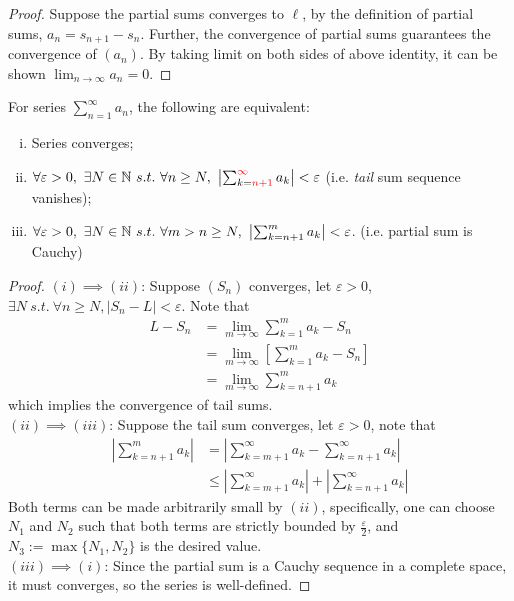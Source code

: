 \documentclass[11pt]{article}
\begin{document}
	\begin{proof}
		Suppose the partial sums converges to $\ell$, by the definition of partial sums, $a_n = s_{n+1} - s_{n}$. Further, the convergence of partial sums guarantees the convergence of $(a_n)$. By taking limit on both sides of above identity, it can be shown $\lim_{n \to \infty} a_n = 0$.
	\end{proof}
	
	\begin{theorem}
		For series $\sum_{n=1}^\infty a_n$, the following are equivalent:
		\begin{enumerate}[(i)]
			\item Series converges;
			\item $\forall \varepsilon > 0,\ \exists N \in \mathbb{N}\ s.t.\ \forall n \geq N,\ \left |\sum_{k=\textcolor{red}{n+1}}^{\textcolor{red}{\infty}} a_k \right | < \varepsilon$ (i.e. \emph{tail} sum sequence vanishes);
			\item $\forall \varepsilon > 0,\ \exists N \in \mathbb{N}\ s.t.\ \forall m > n \geq N,\ \left | \sum_{k=n+1}^m a_k \right | < \varepsilon$. (i.e. partial sum is Cauchy)
		\end{enumerate}
	\end{theorem}
	\begin{proof}
		$(i) \implies (ii)$: Suppose $(S_n)$ converges, let $\varepsilon > 0$, $\exists N\ s.t.\ \forall n \geq N, |S_n - L| < \varepsilon$. Note that 
		\begin{align}
			L - S_n &= \lim_{m \to \infty} \sum_{k=1}^m a_k  - S_n \\
			&= \lim_{m \to \infty} \left [ \sum_{k=1}^m a_k  - S_n \right ]\\
			&= \lim_{m \to \infty} \sum_{k=n+1}^m a_k
		\end{align}
		which implies the convergence of tail sums. \\
		$(ii) \implies (iii)$: Suppose the tail sum converges, let $\varepsilon > 0$, note that
		\begin{align}
			\left | 
			\sum_{k=n+1}^{m} a_k
			\right| &= \left |
			\sum_{k=m+1}^\infty a_k - \sum_{k=n+1}^\infty a_k
			\right| \\
			&\leq \left |
			\sum_{k=m+1}^\infty a_k \right | + \left | \sum_{k=n+1}^\infty a_k
			\right|
		\end{align}
		Both terms can be made arbitrarily small by $(ii)$, specifically, one can choose $N_1$ and $N_2$ such that both terms are strictly bounded by $\frac{\varepsilon}{2}$, and $N_3 := \max\{N_1, N_2\}$ is the desired value. \\
		$(iii) \implies (i)$: Since the partial sum is a Cauchy sequence in a complete space, it must converges, so the series is well-defined.
	\end{proof}
	
\end{document}

